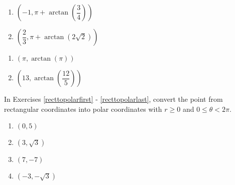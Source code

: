 \begin{multicols}{2} 

\begin{enumerate}

\setcounter{enumi}{\value{HW}}

\item $\left( -1, \pi + \arctan\left(\dfrac{3}{4}\right) \right)$ 
\item $\left( \dfrac{2}{3}, \pi + \arctan\left(2\sqrt{2}\right) \right)$

\setcounter{HW}{\value{enumi}}

\end{enumerate}

\end{multicols}

\begin{multicols}{2} 

\begin{enumerate}

\setcounter{enumi}{\value{HW}}

\item $\left( \pi, \arctan(\pi) \right)$ 
\item $\left( 13, \arctan \left( \dfrac{12}{5} \right) \right)$ \label{polartorectlast}

\setcounter{HW}{\value{enumi}}

\end{enumerate}

\end{multicols}

In Exercises \ref{recttopolarfirst} - \ref{recttopolarlast}, convert the point from rectangular coordinates into polar coordinates with $r \geq 0$ and $0 \leq \theta < 2\pi$.  

\begin{multicols}{4}

\begin{enumerate}

\setcounter{enumi}{\value{HW}}

\item $(0, 5)$ \label{recttopolarfirst} 
\item $(3, \sqrt{3})$
\item $(7, -7)$
\item $(-3, -\sqrt{3})$

\setcounter{HW}{\value{enumi}}

\end{enumerate}

\end{multicols}

